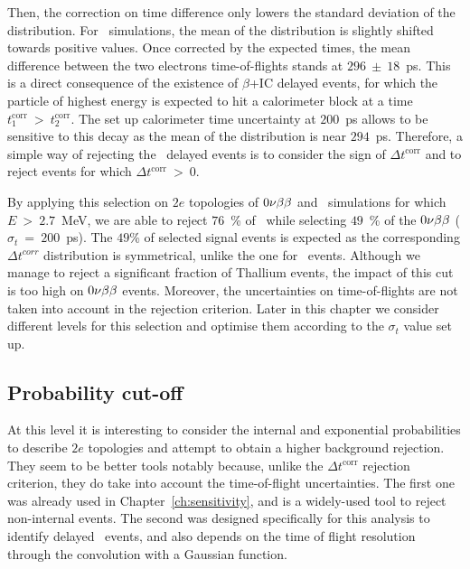 Then, the correction on time difference only lowers the standard deviation of the distribution.
For \Tl\ simulations, the mean of the distribution is slightly shifted towards positive values.
Once corrected by the expected times, the mean difference between the two electrons time-of-flights stands at $296~\pm~18$~ps.
This is a direct consequence of the existence of $\beta$+IC delayed events, for which the particle of highest energy is expected to hit a calorimeter block at a time $t^{\text{corr}}_{1}~>~t^{\text{corr}}_{2}$.
The set up calorimeter time uncertainty at $200$~ps allows to be sensitive to this decay as the mean of the distribution is near $294$~ps.
Therefore, a simple way of rejecting the \Tl\ delayed events is to consider the sign of $\Delta t^{\text{corr}}$ and to reject events for which $\Delta t^{\text{corr}}~>~0$.

By applying this selection on $2e$ topologies of $0\nu\beta\beta$ and \Tl\ simulations for which $E~>~2.7$~MeV, we are able to reject $76$~\% of \Tl\, while selecting $49$~\% of the $0\nu\beta\beta$ ($\sigma_{t}~=~200$~ps).
The $49$\% of selected signal events is expected as the corresponding $\Delta t^{corr}$ distribution is symmetrical, unlike the one for \Tl\ events.
Although we manage to reject a significant fraction of Thallium events, the impact of this cut is too high on $0\nu\beta\beta$ events.
Moreover, the uncertainties on time-of-flights are not taken into account in the rejection criterion.
Later in this chapter we consider different levels for this selection and optimise them according to the $\sigma_{t}$ value set up.

\subsection{Probability cut-off}

At this level it is interesting to consider the internal and exponential probabilities to describe $2e$ topologies and attempt to obtain a higher background rejection.
They seem to be better tools notably because, unlike the $\Delta t^{\text{corr}}$ rejection criterion, they do take into account the time-of-flight uncertainties.
The first one was already used in Chapter~\ref{ch:sensitivity}, and is a widely-used tool to reject non-internal events.
The second was designed specifically for this analysis to identify delayed \Tl\ events, and also depends on the time of flight resolution through the convolution with a Gaussian function.


